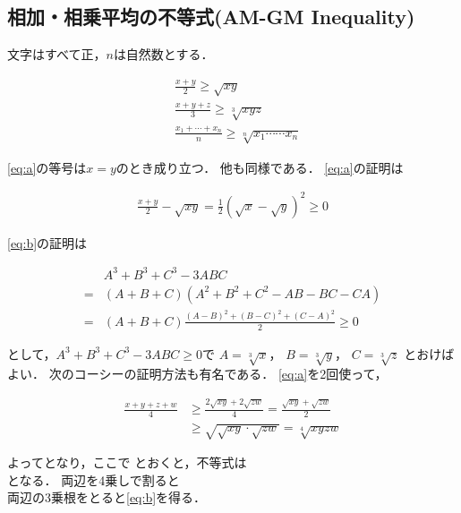 \documentclass[twocolumn]{ltjsarticle}
\begin{document}
\subsection{相加・相乗平均の不等式(AM-GM Inequality)}
文字はすべて正，$n$は自然数とする．
\begin{fleqn}[20pt]
  \begin{align*}
    &\frac{x+y}{2} \geq \sqrt{xy} \tag*{(A)}\label{eq:a}\\
    &\frac{x+y+z}{3} \geq \sqrt[3]{xyz} \tag*{(B)}\label{eq:b}\\
    &\frac{x_{1}+ \cdots +x_{n}}{n} \geq \sqrt[n]{x_{1}\cdots\cdots x_{n}}
  \end{align*}
\end{fleqn}
\ref*{eq:a}の等号は$x=y$のとき成り立つ．
他も同様である．
\ref*{eq:a}の証明は
\begin{fleqn}[20pt]
  \begin{align*}
    \frac{x+y}{2} - \sqrt{xy} = \frac{1}{2}(\sqrt{x}-\sqrt{y})^2 \geq 0
  \end{align*}
\end{fleqn}
\ref*{eq:b}の証明は
\begin{fleqn}[20pt]
  \begin{align*}
    &A^3+B^3+C^3-3ABC\\
    =&(A+B+C)(A^2+B^2+C^2-AB-BC-CA)\\
    =&(A+B+C)\frac{(A-B)^2 + (B-C)^2 + (C-A)^2}{2}\geq 0
  \end{align*}
\end{fleqn}
\begin{spacing}{1.5}
\noindent として，$A^3+B^3+C^3-3ABC\geq 0$で
$A=\sqrt[3]{x}$，
$B=\sqrt[3]{y}$，
$C=\sqrt[3]{z}$
とおけばよい．
次のコーシーの証明方法も有名である．
\ref*{eq:a}を2回使って，
\begin{fleqn}[20pt]
  \begin{align*}
    \frac{x+y+z+w}{4}
    &\geq \frac{2\sqrt{xy}+2\sqrt{zw}}{4} = \frac{\sqrt{xy}+\sqrt{zw}}{2}\\
    &\geq \sqrt{\sqrt{xy}\cdot \sqrt{zw}}=\sqrt[4]{xyzw}
  \end{align*}
\end{fleqn}
よってとなり，ここで
とおくと，不等式は\\
となる．
両辺を4乗しで割ると
 \\
両辺の3乗根をとると\ref*{eq:b}を得る．
\end{spacing}
\end{document}
